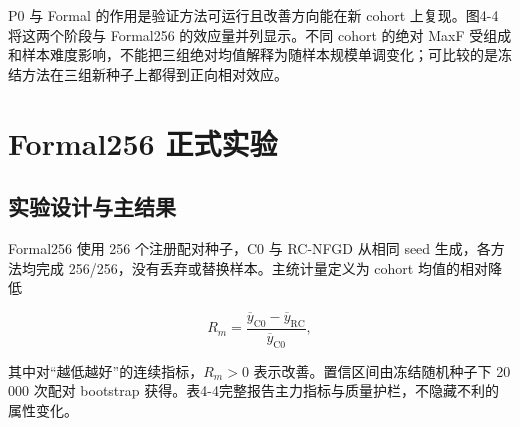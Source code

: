 P0 与 Formal 的作用是验证方法可运行且改善方向能在新 cohort 上复现。图4-4将这两个阶段与 Formal256 的效应量并列显示。不同 cohort 的绝对 MaxF 受组成和样本难度影响，不能把三组绝对均值解释为随样本规模单调变化；可比较的是冻结方法在三组新种子上都得到正向相对效应。

\section{Formal256 正式实验}

\subsection{实验设计与主结果}

Formal256 使用 256 个注册配对种子，C0 与 RC-NFGD 从相同 seed 生成，各方法均完成 256/256，没有丢弃或替换样本。主统计量定义为 cohort 均值的相对降低

\[
R_m=\frac{\overline y_{\mathrm{C0}}-\overline y_{\mathrm{RC}}}
{\overline y_{\mathrm{C0}}},
\]

其中对``越低越好''的连续指标，\(R_m>0\) 表示改善。置信区间由冻结随机种子下 20 000 次配对 bootstrap 获得。表4-4完整报告主力指标与质量护栏，不隐藏不利的属性变化。


